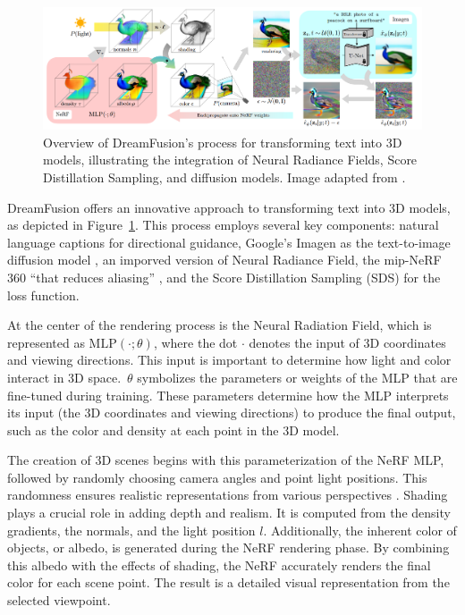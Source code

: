 \begin{figure}[ht]
  \centering
    \includegraphics[width=1\columnwidth]{figures/Dreamfusion.png}
    \caption{Overview of DreamFusion's process for transforming text into 3D models, illustrating the integration of Neural Radiance Fields, Score Distillation Sampling, and diffusion models. Image adapted from \citep{pooleDreamfusion}.}\label{fig:figureDreamfusion}
  \end{figure}

DreamFusion offers an innovative approach to transforming text into 3D models, as depicted in Figure~\ref{fig:figureDreamfusion}. This process employs several key components: natural language captions for directional guidance, Google's Imagen as the text-to-image diffusion model \citep{saharia2022imagen}, an imporved version of Neural Radiance Field, the mip-NeRF 360 \citep{barron2022mipnerf} ``that reduces aliasing'' \citep{pooleDreamfusion}, and the Score Distillation Sampling (SDS) for the loss function.

At the center of the rendering process is the Neural Radiation Field, which is represented as \( \text{MLP}(\cdot; \theta) \), where the dot \(\cdot\) denotes the input of 3D coordinates and viewing directions. This input is important to determine how light and color interact in 3D space.~\(\theta\) symbolizes the parameters or weights of the MLP that are fine-tuned during training. These parameters determine how the MLP interprets its input (the 3D coordinates and viewing directions) to produce the final output, such as the color and density at each point in the 3D model.

The creation of 3D scenes begins with this parameterization of the NeRF MLP, followed by randomly choosing camera angles and point light positions. This randomness ensures realistic representations from various perspectives \citep{pooleDreamfusion}. Shading plays a crucial role in adding depth and realism. 
It is computed from the density gradients, the normals, and the light position \( l \). Additionally, the inherent color of objects, or albedo, is generated during the NeRF rendering phase. By combining this albedo with the effects of shading, the NeRF accurately renders the final color for each scene point. The result is a detailed visual representation from the selected viewpoint.

